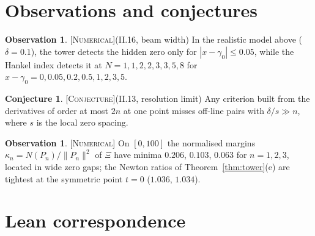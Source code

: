 \documentclass[11pt]{amsart}
\theoremstyle{plain}
\theoremstyle{definition}
\newtheorem{observation}[theorem]{Observation}
\newtheorem{conjecture}[theorem]{Conjecture}
\newcommand{\status}[1]{\textsc{[#1]}}
\begin{document}
\section{Observations and conjectures}

\begin{observation}\status{Numerical}(II.16, beam width)
In the realistic model above ($\delta=0.1$), the tower detects the hidden zero only for
$|x-\gamma_0|\le0.05$, while the Hankel index detects it at $N=1,1,2,2,3,3,5,8$ for
$x-\gamma_0=0,0.05,0.2,0.5,1,2,3,5$.
\end{observation}
\begin{conjecture}\status{Conjecture}(II.13, resolution limit)
Any criterion built from the derivatives of order at most $2n$ at one point misses off-line
pairs with $\delta/s\gg n$, where $s$ is the local zero spacing.
\end{conjecture}
\begin{observation}\status{Numerical}
On $[0,100]$ the normalised margins $\kappa_n=N(P_n)/\|P_n\|^2$ of $\Xi$ have minima
$0.206$, $0.103$, $0.063$ for $n=1,2,3$, located in wide zero gaps; the Newton ratios of
Theorem~\ref{thm:tower}(e) are tightest at the symmetric point $t=0$ ($1.036$, $1.034$).
\end{observation}

\section{Lean correspondence}\label{sec:lean}
\end{document}
